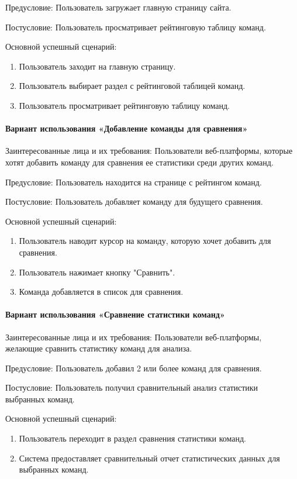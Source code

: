 Предусловие: Пользователь загружает главную страницу сайта.

Постусловие: Пользователь просматривает рейтинговую таблицу команд.

Основной успешный сценарий:
\begin{enumerate}
	\item Пользователь заходит на главную страницу.
	\item Пользователь выбирает раздел с рейтинговой таблицей команд.
	\item Пользователь просматривает рейтинговую таблицу команд.
\end{enumerate}

\paragraph{Вариант использования «Добавление команды для сравнения»}

Заинтересованные лица и их требования: Пользователи веб-платформы, которые хотят добавить команду для сравнения ее статистики среди других команд.

Предусловие: Пользователь находится на странице с рейтингом команд.

Постусловие: Пользователь добавляет команду для будущего сравнения.

Основной успешный сценарий:
\begin{enumerate}
	\item Пользователь наводит курсор на команду, которую хочет добавить для сравнения.
	\item Пользователь нажимает кнопку "Сравнить".
	\item Команда добавляется в список для сравнения.
\end{enumerate}

\paragraph{Вариант использования «Сравнение статистики команд»}

Заинтересованные лица и их требования: Пользователи веб-платформы, желающие сравнить статистику команд для анализа.

Предусловие: Пользователь добавил 2 или более команд для сравнения.

Постусловие: Пользователь получил сравнительный анализ статистики выбранных команд.

Основной успешный сценарий:
\begin{enumerate}
	\item Пользователь переходит в раздел сравнения статистики команд.
	\item Система предоставляет сравнительный отчет статистических данных для выбранных команд.
\end{enumerate}

